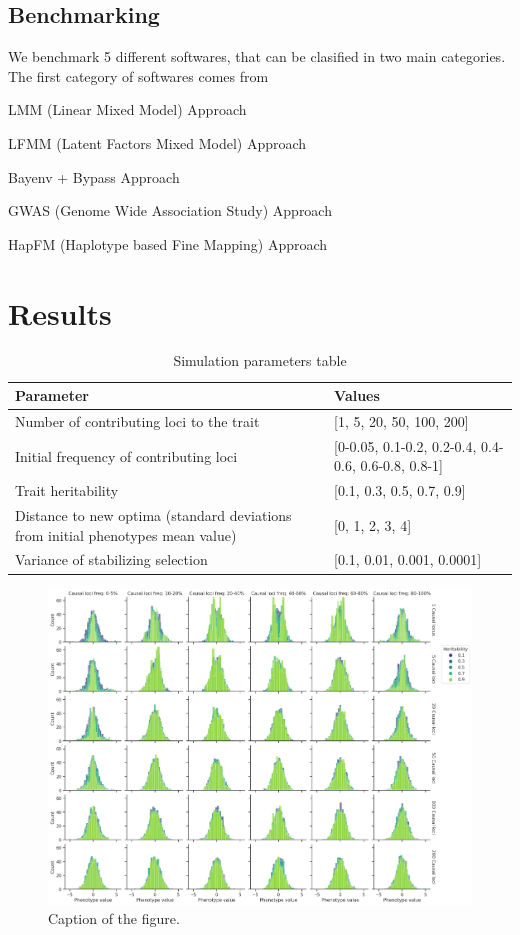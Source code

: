 \documentclass{article}
\begin{document}
\subsection{Benchmarking}

We benchmark 5 different softwares, that can be clasified in two main categories. The first category of softwares comes from 

LMM (Linear Mixed Model) Approach 

LFMM (Latent Factors Mixed Model) Approach

Bayenv + Bypass Approach 

GWAS (Genome Wide Association Study) Approach 

HapFM (Haplotype based Fine Mapping) Approach 

\section{Results}

\begin{table}
\centering
\begin{tabularx}{\textwidth}[t]{XX} \toprule
{Parameter} & {Values} \\ \midrule
{Number of contributing loci to the trait} & {[1, 5, 20, 50, 100, 200]} \\ \midrule
{Initial frequency of contributing loci} & {[0-0.05, 0.1-0.2, 0.2-0.4, 0.4-0.6, 0.6-0.8, 0.8-1]}\\ \midrule
{Trait heritability} & {[0.1, 0.3, 0.5, 0.7, 0.9]} \\ \midrule
{Distance to new optima (standard deviations from initial phenotypes mean value)} & {[0, 1, 2, 3, 4]}\\ \midrule
{Variance of stabilizing selection} & {[0.1, 0.01, 0.001, 0.0001]} \\ \bottomrule
\end{tabularx}
\caption{Simulation parameters table}
\label{simulation_parameters_table}
\end{table}

\begin{figure}[h]
    \centering
    \includegraphics[width=1.1\textwidth]{figures/phenotypes_initial.png}
    \caption{Caption of the figure.}
    \label{fig:phenotypes_initial}
\end{figure}
\end{document}
